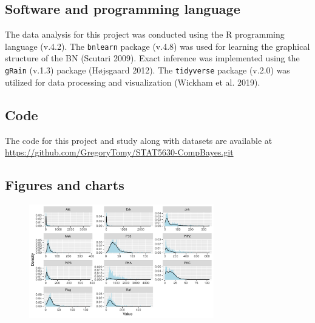\documentclass[twocol]{ametsoc}
\begin{document}
\appendix

\hypertarget{software-and-programming-language}{%
\subsection{Software and programming
language}\label{software-and-programming-language}}

The data analysis for this project was conducted using the R programming
language (v.4.2). The \texttt{bnlearn} package (v.4.8) was used for
learning the graphical structure of the BN (Scutari 2009). Exact
inference was implemented using the \texttt{gRain} (v.1.3) package
(Højsgaard 2012). The \texttt{tidyverse} package (v.2.0) was utilized
for data processing and visualization (Wickham et al. 2019).

\hypertarget{code}{%
\subsection{Code}\label{code}}

The code for this project and study along with datasets are available at
\url{https://github.com/GregoryTomy/STAT5630-CompBayes.git}

\hypertarget{figures-and-charts}{%
\subsection{Figures and charts}\label{figures-and-charts}}

\begin{figure}[h]
\centerline{\includegraphics[width = 19pc]{images/molecule_skews.pdf}}
\end{figure}
\end{document}
